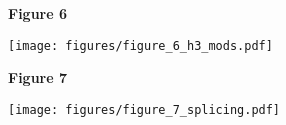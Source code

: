 \documentclass[8pt]{extarticle}
\begin{document}

\newpage

\textbf{\large Figure 6}

\vspace{5.5pt}
\texttt{[image: figures/figure\_6\_h3\_mods.pdf]}


\newpage

\textbf{\large Figure 7}

\texttt{[image: figures/figure\_7\_splicing.pdf]}
\end{document}
